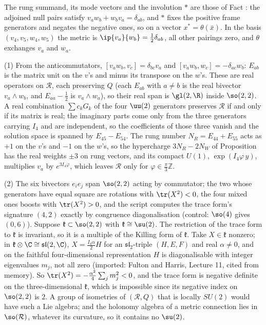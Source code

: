The rung summand, its mode vectors and the involution $*$ are those of Fact : the adjoined null pairs satisfy $v_{a}w_{b} + w_{b}v_{a} = \delta_{ab}$, and $*$ fixes the positive frame generators and negates the negative ones, so on a vector $x^{*} = \theta(\bar{x})$. In the basis $(v_{4}, v_{5}, w_{4}, w_{5})$ the metric is $\ip{v_{a}}{w_{b}} = \tfrac12\delta_{ab}$, all other pairings zero, and $\theta$ exchanges $v_{a}$ and $w_{a}$.

(1) From the anticommutators, $[v_{a}w_{b}, v_{c}] = \delta_{bc}v_{a}$ and $[v_{a}w_{b}, w_{c}] = -\delta_{ac}w_{b}$: $E_{ab}$ is the matrix unit on the $v$'s and minus its transpose on the $w$'s. These are real operators on $\mathcal{R}$, each preserving $Q$ (each $E_{ab}$ with $a \neq b$ is the real bivector $v_{a}\wedge w_{b}$, and $E_{aa} - \tfrac12$ is $v_{a}\wedge w_{a}$), so their real span is $\gl(2,\R)$ inside $\so(2,2)$. A real combination $\sum c_{k}G_{k}$ of the four $\uu(2)$ generators preserves $\mathcal{R}$ if and only if its matrix is real; the imaginary parts come only from the three generators carrying $I_{4}$ and are independent, so the coefficients of those three vanish and the solution space is spanned by $E_{45} - E_{54}$. The rung number $N_{R} = E_{44} + E_{55}$ acts as $+1$ on the $v$'s and $-1$ on the $w$'s, so the hypercharge $3N_{R} - 2N_{W}$ of Proposition  has the real weights $\pm 3$ on rung vectors, and its compact $U(1)$, $\exp(I_{4}\varphi\,y)$, multiplies $v_{a}$ by $e^{3I_{4}\varphi}$, which leaves $\mathcal{R}$ only for $\varphi \in \tfrac{\pi}{3}\mathbb{Z}$.

(2) The six bivectors $e_{i}e_{j}$ span $\so(2,2)$ acting by commutator; the two whose generators have equal square are rotations with $\tr(X^{2}) < 0$, the four mixed ones boosts with $\tr(X^{2}) > 0$, and the script computes the trace form's signature $(4,2)$ exactly by congruence diagonalisation (control: $\so(4)$ gives $(0,6)$). Suppose $\mathfrak{k} \subset \so(2,2)$ with $\mathfrak{k} \cong \su(2)$. The restriction of the trace form to $\mathfrak{k}$ is invariant, so it is a multiple of the Killing form of $\mathfrak{k}$. Take $X \in \mathfrak{k}$ nonzero; in $\mathfrak{k}\otimes\C \cong \mathfrak{sl}(2,\C)$, $X = \tfrac{I_{4}\alpha}{2}H$ for an $\mathfrak{sl}_{2}$-triple $(H, E, F)$ and real $\alpha \neq 0$, and on the faithful four-dimensional representation $H$ is diagonalisable with integer eigenvalues $m_{j}$, not all zero (imported: Fulton and Harris, Lecture 11, cited from memory). So $\tr(X^{2}) = -\tfrac{\alpha^{2}}{4}\sum_{j} m_{j}^{2} < 0$, and the trace form is negative definite on the three-dimensional $\mathfrak{k}$, which is impossible since its negative index on $\so(2,2)$ is $2$. A group of isometries of $(\mathcal{R}, Q)$ that is locally $SU(2)$ would have such a Lie algebra; and the holonomy algebra of a metric connection lies in $\so(\mathcal{R})$, whatever its curvature, so it contains no $\su(2)$.

